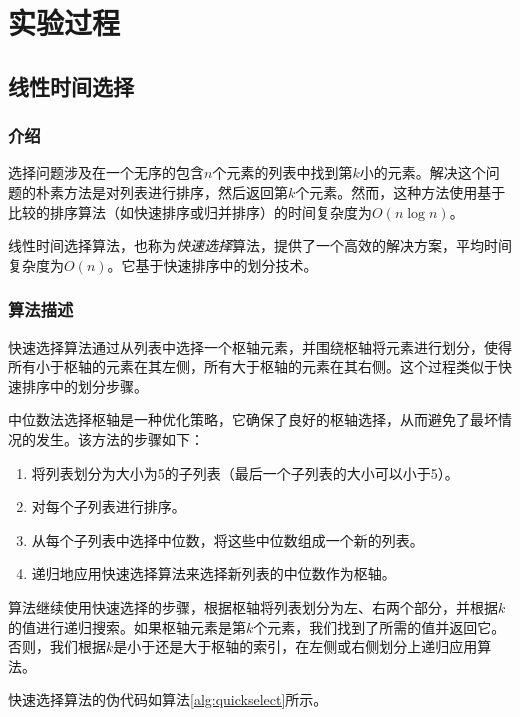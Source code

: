 \documentclass[lang=cn,11pt,a4paper]{elegantpaper}
\begin{document}
\section{实验过程}

\subsection{线性时间选择}

\subsubsection{介绍}

选择问题涉及在一个无序的包含$n$个元素的列表中找到第$k$小的元素。解决这个问题的朴素方法是对列表进行排序，然后返回第$k$个元素。然而，这种方法使用基于比较的排序算法（如快速排序或归并排序）的时间复杂度为$O(n \log n)$。

线性时间选择算法，也称为\textit{快速选择}算法，提供了一个高效的解决方案，平均时间复杂度为$O(n)$。它基于快速排序中的划分技术。

\subsubsection{算法描述}

快速选择算法通过从列表中选择一个枢轴元素，并围绕枢轴将元素进行划分，使得所有小于枢轴的元素在其左侧，所有大于枢轴的元素在其右侧。这个过程类似于快速排序中的划分步骤。

中位数法选择枢轴是一种优化策略，它确保了良好的枢轴选择，从而避免了最坏情况的发生。该方法的步骤如下：
\begin{enumerate}
  \item 将列表划分为大小为5的子列表（最后一个子列表的大小可以小于5）。
  \item 对每个子列表进行排序。
  \item 从每个子列表中选择中位数，将这些中位数组成一个新的列表。
  \item 递归地应用快速选择算法来选择新列表的中位数作为枢轴。
\end{enumerate}

算法继续使用快速选择的步骤，根据枢轴将列表划分为左、右两个部分，并根据$k$的值进行递归搜索。如果枢轴元素是第$k$个元素，我们找到了所需的值并返回它。否则，我们根据$k$是小于还是大于枢轴的索引，在左侧或右侧划分上递归应用算法。

快速选择算法的伪代码如算法\ref{alg:quickselect}所示。
\end{document}
